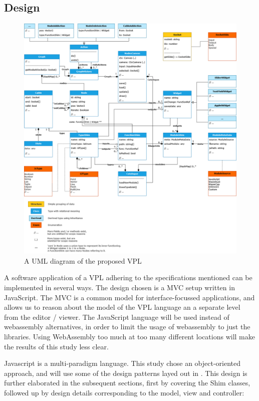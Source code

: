 \subsection{Design}

\begin{figure}
  \centering
  \graphicspath{ {../../assets/uml/} }
  \includegraphics[width=\linewidth]{geofront-uml.png}
  \caption{A UML diagram of the proposed VPL}
  \label{fig:geofront-uml}
\end{figure}

A software application of a VPL adhering to the specifications mentioned can be implemented in several ways. 
The design chosen is a \ac{MVC} setup written in JavaScript.  
The \ac{MVC} is a common model for interface-focussed applications, and allows us to reason about the model of the VPL language an a separate level from the editor / viewer.
The JavaScript language will be used instead of webassembly alternatives, in order to limit the usage of webassembly to just the libraries. 
Using WebAssembly too much at too many different locations will make the results of this study less clear.

Javascript is a multi-paradigm language.
This study chose an object-oriented approach, and will use some of the design patterns layed out in \citep{gamma_design_1994}.
This design is further elaborated in the subsequent sections, first by covering the Shim classes, followed up by design details corresponding to the model, view and controller:

